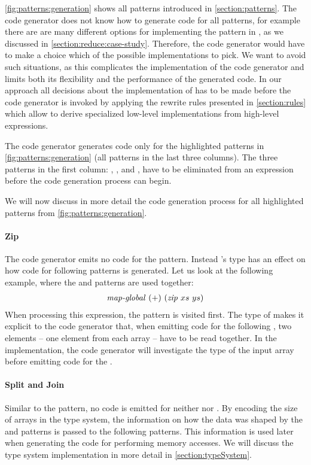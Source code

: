 \autoref{fig:patterns:generation} shows all patterns introduced in \autoref{section:patterns}.
The code generator does not know how to generate \OpenCL code for all patterns, for example there are are many different options for implementing the \reduce pattern in \OpenCL, as we discussed in \autoref{section:reduce:case-study}.
Therefore, the code generator would have to make a choice which of the possible implementations to pick.
We want to avoid such situations, as this complicates the implementation of the code generator and limits both its flexibility and the performance of the generated code.
In our approach all decisions about the implementation of \reduce has to be made before the code generator is invoked by applying the rewrite rules presented in \autoref{section:rules} which allow to derive specialized low-level implementations from high-level expressions.

The code generator generates code only for the highlighted patterns in \autoref{fig:patterns:generation} (all patterns in the last three columns).
The three patterns in the first column: \map, \reduce, and \reorder, have to be eliminated from an expression before the code generation process can begin.

We will now discuss in more detail the code generation process for all highlighted patterns from \autoref{fig:patterns:generation}.

\paragraph{Zip}
The code generator emits no \OpenCL code for the \zip pattern.
Instead \zip's type has an effect on how code for following patterns is generated.
Let us look at the following example, where the \zip and \mapGlobal patterns are used together:
\begin{align}
  \text{\textit{map-global}}\ (+)\ (\text{\textit{zip}}\ xs\ ys)
\end{align}
When processing this expression, the \zip pattern is visited first.
The type of \zip makes it explicit to the code generator that, when emitting code for the following \mapGlobal, two elements -- one element from each array -- have to be read together.
In the implementation, the code generator will investigate the type of the input array before emitting code for the \mapGlobal.

\paragraph{Split and Join}
Similar to the \zip pattern, no \OpenCL code is emitted for neither \splitN nor \join.
By encoding the size of arrays in the type system, the information on how the data was shaped by the \splitN and \join patterns is passed to the following patterns.
This information is used later when generating the \OpenCL code for performing \OpenCL memory accesses. 
We will discuss the type system implementation in more detail in \autoref{section:typeSystem}.

